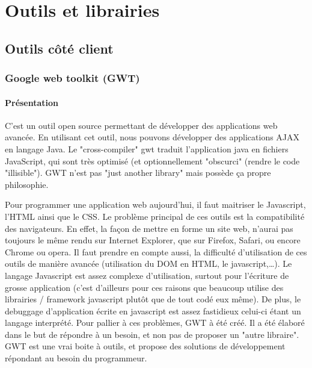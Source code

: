 
\chapter{Outils et librairies}


\section{Outils côté client}
\subsection{Google web toolkit (GWT)}

\subsubsection{Présentation}
C'est un outil open source permettant de développer des applications web avancée. En utilisant cet outil, nous pouvons développer des applications AJAX en langage Java. 
Le "cross-compiler" gwt traduit l'application java en fichiers JavaScript, qui sont très optimisé (et optionnellement "obscurci" (rendre le code "illisible").
GWT n'est pas "just another library" mais possède ça propre philosophie.

Pour programmer une application web aujourd'hui, il faut maitriser le Javascript, l'HTML ainsi que le CSS. Le problème principal de ces outils est la compatibilité des navigateurs. En effet, la façon de mettre en forme un site web, n'aurai pas toujours le même rendu sur Internet Explorer, que sur Firefox, Safari, ou encore Chrome ou opera. Il faut prendre en compte aussi, la difficulté d'utilisation de ces outils de manière avancée (utilisation du DOM en HTML, le javascript,…). Le langage Javascript est assez complexe d'utilisation, surtout pour l'écriture de grosse application (c'est d'ailleurs pour ces raisons que beaucoup utilise des librairies / framework javascript plutôt que de tout codé eux même). De plus, le debuggage d'application écrite en javascript est assez fastidieux celui-ci étant un langage interprété. Pour pallier à ces problèmes, GWT à été créé. Il a été élaboré dans le but de répondre à un besoin, et non pas de proposer un "autre libraire". GWT est une vrai boite à outils, et propose des solutions de développement répondant au besoin du programmeur.


